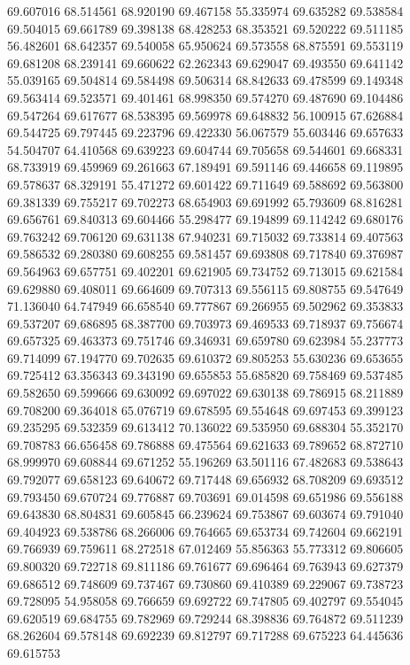 69.607016
68.514561
68.920190
69.467158
55.335974
69.635282
69.538584
69.504015
69.661789
69.398138
68.428253
68.353521
69.520222
69.511185
56.482601
68.642357
69.540058
65.950624
69.573558
68.875591
69.553119
69.681208
68.239141
69.660622
62.262343
69.629047
69.493550
69.641142
55.039165
69.504814
69.584498
69.506314
68.842633
69.478599
69.149348
69.563414
69.523571
69.401461
68.998350
69.574270
69.487690
69.104486
69.547264
69.617677
68.538395
69.569978
69.648832
56.100915
67.626884
69.544725
69.797445
69.223796
69.422330
56.067579
55.603446
69.657633
54.504707
64.410568
69.639223
69.604744
69.705658
69.544601
69.668331
68.733919
69.459969
69.261663
67.189491
69.591146
69.446658
69.119895
69.578637
68.329191
55.471272
69.601422
69.711649
69.588692
69.563800
69.381339
69.755217
69.702273
68.654903
69.691992
65.793609
68.816281
69.656761
69.840313
69.604466
55.298477
69.194899
69.114242
69.680176
69.763242
69.706120
69.631138
67.940231
69.715032
69.733814
69.407563
69.586532
69.280380
69.608255
69.581457
69.693808
69.717840
69.376987
69.564963
69.657751
69.402201
69.621905
69.734752
69.713015
69.621584
69.629880
69.408011
69.664609
69.707313
69.556115
69.808755
69.547649
71.136040
64.747949
66.658540
69.777867
69.266955
69.502962
69.353833
69.537207
69.686895
68.387700
69.703973
69.469533
69.718937
69.756674
69.657325
69.463373
69.751746
69.346931
69.659780
69.623984
55.237773
69.714099
67.194770
69.702635
69.610372
69.805253
55.630236
69.653655
69.725412
63.356343
69.343190
69.655853
55.685820
69.758469
69.537485
69.582650
69.599666
69.630092
69.697022
69.630138
69.786915
68.211889
69.708200
69.364018
65.076719
69.678595
69.554648
69.697453
69.399123
69.235295
69.532359
69.613412
70.136022
69.535950
69.688304
55.352170
69.708783
66.656458
69.786888
69.475564
69.621633
69.789652
68.872710
68.999970
69.608844
69.671252
55.196269
63.501116
67.482683
69.538643
69.792077
69.658123
69.640672
69.717448
69.656932
68.708209
69.693512
69.793450
69.670724
69.776887
69.703691
69.014598
69.651986
69.556188
69.643830
68.804831
69.605845
66.239624
69.753867
69.603674
69.791040
69.404923
69.538786
68.266006
69.764665
69.653734
69.742604
69.662191
69.766939
69.759611
68.272518
67.012469
55.856363
55.773312
69.806605
69.800320
69.722718
69.811186
69.761677
69.696464
69.763943
69.627379
69.686512
69.748609
69.737467
69.730860
69.410389
69.229067
69.738723
69.728095
54.958058
69.766659
69.692722
69.747805
69.402797
69.554045
69.620519
69.684755
69.782969
69.729244
68.398836
69.764872
69.511239
68.262604
69.578148
69.692239
69.812797
69.717288
69.675223
64.445636
69.615753

